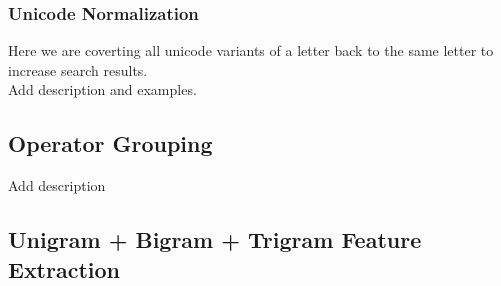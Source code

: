 \documentclass[
journal=jacsat, %
manuscript=article]{achemso}
\begin{document}
	  \subsubsection{Unicode Normalization}
	  Here we are coverting all unicode variants of a letter back to the same letter to increase search results. \\ 
	  Add description and examples.
	
	\subsection{Operator Grouping }
	
	Add description
	
	\subsection{Unigram + Bigram + Trigram Feature Extraction}
	
\end{document}
